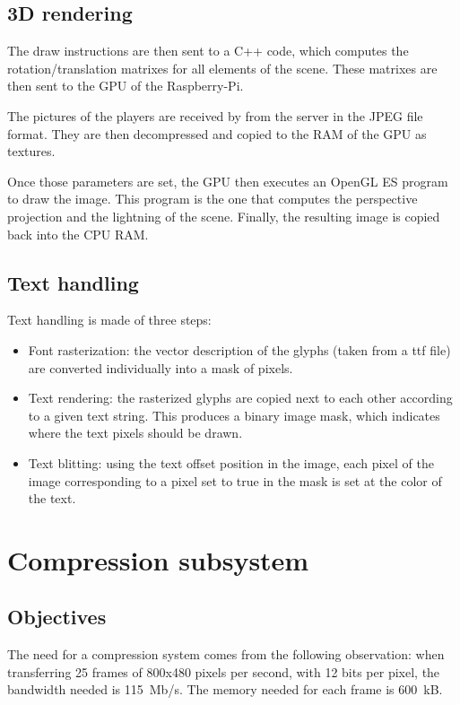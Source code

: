 \documentclass[english, DIV=13]{scrartcl}
\begin{document}
\subsection{3D rendering}

The draw instructions are then sent to a C++ code, which computes the rotation/translation
matrixes for all elements of the scene. These matrixes are then sent to the GPU of the
Raspberry-Pi.

The pictures of the players are received by from the server in the JPEG file format.
They are then decompressed and copied to the RAM of the GPU as textures.

Once those parameters are set, the GPU then executes an OpenGL ES program to draw the image.
This program is the one that computes the perspective projection and the lightning of the scene.
Finally, the resulting image is copied back into the CPU RAM.

\subsection{Text handling}

Text handling is made of three steps:
\begin{itemize}
    \item Font rasterization: the vector description of the glyphs (taken from a ttf file)
        are converted individually into a mask of pixels.
    \item Text rendering: the rasterized glyphs are copied next to each other according
        to a given text string. This produces a binary image mask, which indicates where
        the text pixels should be drawn.
    \item Text blitting: using the text offset position in the image, each pixel of the image
        corresponding to a pixel set to true in the mask is set at the color of the text.
\end{itemize}


\section{Compression subsystem}
\label{sec:compression}

\subsection{Objectives}

The need for a compression system comes from the following observation:
when transferring 25 frames of 800x480 pixels per second, with 12 bits per pixel,
the bandwidth needed is \SI{115}{Mb/s}. The memory needed for each frame
is \SI{600}{kB}.
\end{document}
